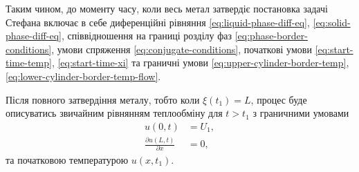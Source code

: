 Таким чином, до моменту часу, коли весь метал затвердіє постановка задачі Стефана включає в себе диференційні рівняння \eqref{eq:liquid-phase-diff-eq}, \eqref{eq:solid-phase-diff-eq}, співвідношення на границі розділу фаз \eqref{eq:phase-border-conditions}, умови спряження \eqref{eq:conjugate-conditions}, початкові умови \eqref{eq:start-time-temp}, \eqref{eq:start-time-xi} та граничні умови \eqref{eq:upper-cylinder-border-temp}, \eqref{eq:lower-cylinder-border-temp-flow}. \medskip

\begin{remark}
	Після повного затвердіння металу, тобто коли $\xi(t_1) = L$, процес буде описуватись звичайним рівнянням теплообміну для $t > t_1$ з граничними умовами
	\begin{align}
		u(0, t) &= U_1, \\
		\frac{\partial u(L, t)}{\partial x} &= 0,
	\end{align}
	та початковою температурою $u(x, t_1)$.
\end{remark}


